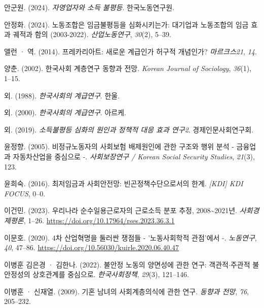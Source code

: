 \documentclass[
  letterpaper,
  DIV=11,
  numbers=noendperiod]{scrartcl}
\newlength{\cslhangindent}
\newenvironment{CSLReferences}[2] %
 {\begin{list}{}{%
  \setlength{\itemindent}{0pt}
  \setlength{\leftmargin}{0pt}
  \setlength{\parsep}{0pt}
  \ifodd #1
   \setlength{\leftmargin}{\cslhangindent}
   \setlength{\itemindent}{-1\cslhangindent}
  \fi
  \setlength{\itemsep}{#2\baselineskip}}}
 {\end{list}}
\begin{document}
\begin{CSLReferences}{1}{0}
안군원. (2024). \emph{{자영업자와 소득 불평등}}. 한국노동연구원.

안정화. (2024). 노동조합은 임금불평등을 심화시키는가: 대기업과
노동조합의 임금 효과 궤적과 함의 (2003-2022). \emph{산업노동연구},
\emph{30}(2), 5--39.

앨런 · 역. (2014). {프레카리아트: 새로운 계급인가 허구적 개념인가?}
\emph{마르크스21}, \emph{14}.

양춘. (2002). {한국사회 계층연구 동향과 전망}. \emph{Korean Journal of
Sociology}, \emph{36}(1), 1--15.

외. (1988). \emph{{한국사회의 계급연구}}. 한울.

외. (2000). \emph{{한국사회의 계급연구}}. 아르케.

외. (2019). \emph{{소득불평등 심화의 원인과 정책적 대응 효과 연구2}}.
경제인문사회연구회.

윤정향. (2005). 비정규노동자의 사회보험 배제원인에 관한 구조와 행위 분석
- 금융업과 자동차산업을 중심으로 -. \emph{사회보장연구 / Korean Social
Security Studies}, \emph{21}(3), 123.

윤희숙. (2016). {최저임금과 사회안전망: 빈곤정책수단으로서의 한계}.
\emph{{[}KDI{]} KDI FOCUS}, 0--0.

이건민. (2023). {우리나라 순수일용근로자의 근로소득 분포 추정,
2008\textasciitilde2021년}. \emph{사회경제평론}, 1--26.
\url{https://doi.org/10.17964/rses.2023.36.3.1}

이문호. (2020). {4차 산업혁명을 둘러싼 쟁점들 - '노동사회학적 관점'에서
-}. \emph{노동연구}, \emph{40}, 47--86.
\url{https://doi.org/10.56030/kuirle.2020.06.40.47}

이병훈 김은경 · 김한나. (2022). {불안정 노동의 양면성에 관한 연구:
객관적{\(\cdot\)}주관적 불안정성의 상호관계를 중심으로}.
\emph{한국사회정책}, \emph{29}(3), 121--146.

이병훈 · 신재열. (2009). {기혼 남녀의 사회계층의식에 관한 연구}.
\emph{동향과 전망}, \emph{76}, 205--232.


\end{CSLReferences}
\end{document}
